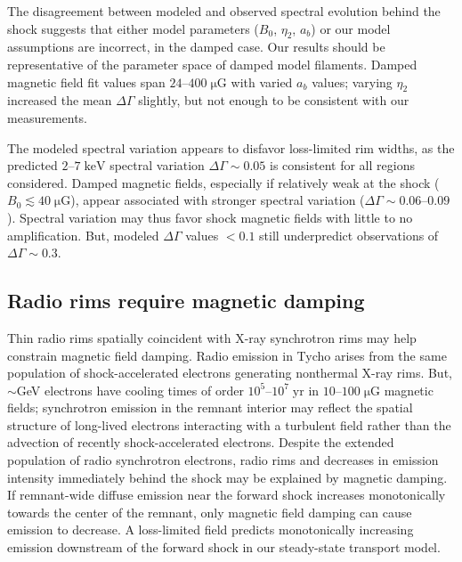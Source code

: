 \documentclass[iop, apj, numberedappendix]{emulateapj}
\newcommand*{\mt}{\mathrm}
\newcommand*{\unit}[1]{\;\mt{#1}}  %
\newcommand*{\abt}{\mathord{\sim}} %
\newcommand*{\muG}{\unit{\mu G}}
\begin{document}
The disagreement between modeled and observed spectral evolution behind the
shock suggests that either model parameters ($B_0$, $\eta_2$, $a_b$) or our
model assumptions are incorrect, in the damped case.  Our results should be
representative of the parameter space of damped model filaments.  Damped
magnetic field fit values span $24$--$400 \muG$ with varied $a_b$ values;
varying $\eta_2$ increased the mean $\Delta\Gamma$ slightly, but not enough to
be consistent with our measurements.

The modeled spectral variation appears to disfavor loss-limited rim widths, as
the predicted $2$--$7 \unit{keV}$ spectral variation $\Delta\Gamma \sim 0.05$
is consistent for all regions considered.  Damped magnetic fields, especially
if relatively weak at the shock ($B_0 \lesssim 40 \muG$), appear associated
with stronger spectral variation ($\Delta\Gamma \sim 0.06$--$0.09$).  Spectral
variation may thus favor shock magnetic fields with little to no amplification.
But, modeled $\Delta\Gamma$ values $< 0.1$ still underpredict observations of
$\Delta\Gamma \sim 0.3$.

\subsection{Radio rims require magnetic damping}

Thin radio rims spatially coincident with X-ray synchrotron rims may help
constrain magnetic field damping.  Radio emission in Tycho arises from the same
population of shock-accelerated electrons generating nonthermal X-ray rims.
But, $\abt$GeV electrons have cooling times of order $10^5$--$10^7 \unit{yr}$
in $10$--$100 \muG$ magnetic fields; synchrotron emission in the remnant
interior may reflect the spatial structure of long-lived electrons interacting
with a turbulent field rather than the advection of recently shock-accelerated
electrons.
Despite the extended population of radio synchrotron electrons, radio rims and
decreases in emission intensity immediately behind the shock may be explained
by magnetic damping.  If remnant-wide diffuse emission near the forward shock
increases monotonically towards the center of the remnant, only magnetic field
damping can cause emission to decrease.  A loss-limited field predicts
monotonically increasing emission downstream of the forward shock in our
steady-state transport model.
\end{document}
